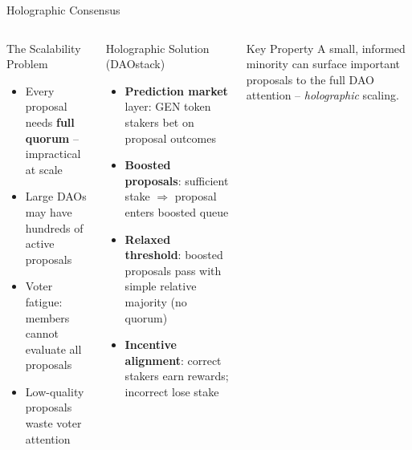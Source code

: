 \documentclass[8pt,aspectratio=169]{beamer}
\begin{document}
\begin{frame}{Holographic Consensus}
\begin{columns}[T]
\begin{block}{The Scalability Problem}
\footnotesize
\begin{itemize}
  \item Every proposal needs \textbf{full quorum} -- impractical at scale
  \item Large DAOs may have hundreds of active proposals
  \item Voter fatigue: members cannot evaluate all proposals
  \item Low-quality proposals waste voter attention
\end{itemize}
\end{block}
\vspace{2mm}
\begin{block}{Holographic Solution (DAOstack)}
\footnotesize
\begin{itemize}
  \item \textbf{Prediction market} layer: GEN token stakers bet on proposal outcomes
  \item \textbf{Boosted proposals}: sufficient stake $\Rightarrow$ proposal enters boosted queue
  \item \textbf{Relaxed threshold}: boosted proposals pass with simple relative majority (no quorum)
  \item \textbf{Incentive alignment}: correct stakers earn rewards; incorrect lose stake
\end{itemize}
\end{block}
\vspace{2mm}
\begin{exampleblock}{Key Property}
\footnotesize
A small, informed minority can surface important proposals to the full DAO attention -- \textit{holographic} scaling.
\end{exampleblock}


\end{columns}
\end{frame}
\end{document}
